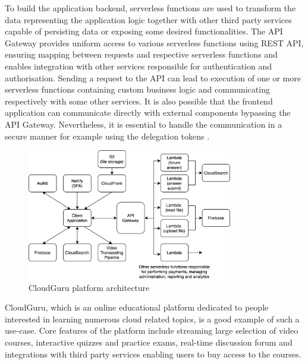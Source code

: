 To build the application backend, serverless functions are used to transform the data representing the application logic together with other third party services capable of persisting data or exposing some desired functionalities. The API Gateway provides uniform access to various serverless functions using REST API, ensuring mapping between requests and respective serverless functions and enables integration with other services responsible for authentication and authorisation. Sending a request to the API can lead to execution of one or more serverless functions containing custom business logic and communicating respectively with some other services. It is also possible that the frontend application can communicate directly with external components bypassing the API Gateway. Nevertheless, it is essential to handle the communication in a secure manner for example using the delegation tokens \cite{ServerlessArchitectureOnAWS}.

\begin{figure}[h]
    \centering
    \includegraphics[width=0.8\textwidth]{assets/02-serverless/CloudGuruArchitecture.png}
    \caption{CloudGuru platform architecture}
    \label{fig:cloudguru-architecture-diagram}
\end{figure}

CloudGuru, which is an online educational platform dedicated to people interested in learning numerous cloud related topics, is a good example of such a use-case. Core features of the platform include streaming large selection of video courses, interactive quizzes and practice exams, real-time discussion forum and integrations with third party services enabling users to buy access to the courses.

